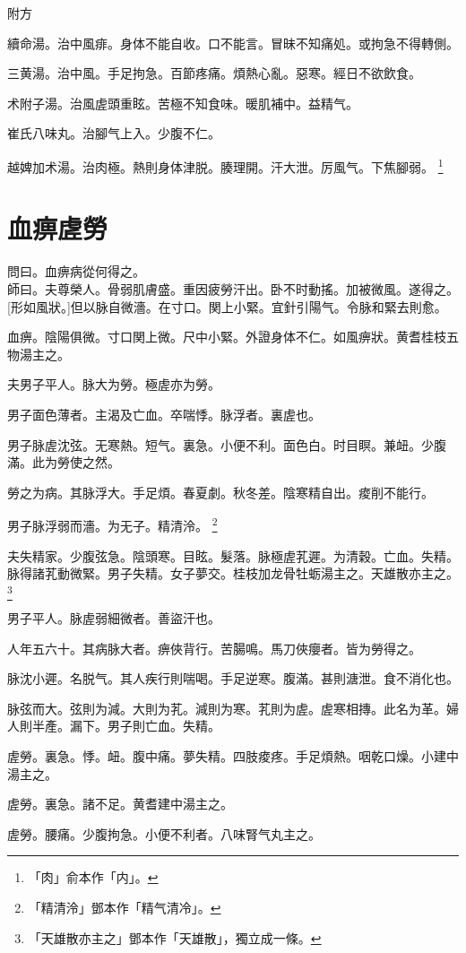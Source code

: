 \documentclass[12pt,twoside,UTF8,b5paper]{ctexbook}
\begin{document}
附方

續命湯。治中風痱。身体不能自收。口不能言。冒昧不知痛処。或拘急不得轉側。

三黄湯。治中風。手足拘急。百節疼痛。煩熱心亂。惡寒。經日不欲飲食。

术附子湯。治風虗頭重眩。苦極不知食味。暖肌補中。益精气。

崔氏八味丸。治腳气上入。少腹不仁。

越婢加术湯。治肉極。熱則身体津脱。腠理開。汗大泄。厉風气。下焦腳弱。
	\footnote{「肉」俞本作「内」。}

\chapter{血痹虗勞}

問曰。血痹病從何得之。\\
師曰。夫尊榮人。骨弱肌膚盛。重因疲勞汗出。卧不时動搖。加被微風。遂得之。[形如風狀。]但以脉自微濇。在寸口。関上小緊。宜針引陽气。令脉和緊去則愈。

血痹。陰陽俱微。寸口関上微。尺中小緊。外證身体不仁。如風痹狀。黄耆桂枝五物湯主之。

夫男子平人。脉大为勞。極虗亦为勞。

男子面色薄者。主渴及亡血。卒喘悸。脉浮者。裏虗也。

男子脉虗沈弦。无寒熱。短气。裏急。小便不利。面色白。时目瞑。兼衄。少腹滿。此为勞使之然。

勞之为病。其脉浮大。手足煩。春夏劇。秋冬差。陰寒精自出。痠削不能行。

男子脉浮弱而濇。为无子。精清泠。
	\footnote{「精清泠」鄧本作「精气清冷」。}

夫失精家。少腹弦急。陰頭寒。目眩。髮落。脉極虗芤遲。为清穀。亡血。失精。脉得諸芤動微緊。男子失精。女子夢交。桂枝加龙骨牡蛎湯主之。天雄散亦主之。
	\footnote{「天雄散亦主之」鄧本作「天雄散」，獨立成一條。}

男子平人。脉虗弱細微者。善盜汗也。

人年五六十。其病脉大者。痹俠背行。苦腸鳴。馬刀俠癭者。皆为勞得之。

脉沈小遲。名脱气。其人疾行則喘喝。手足逆寒。腹滿。甚則溏泄。食不消化也。

脉弦而大。弦則为減。大則为芤。減則为寒。芤則为虗。虗寒相摶。此名为革。婦人則半產。漏下。男子則亡血。失精。

虗勞。裏急。悸。衄。腹中痛。夢失精。四肢痠疼。手足煩熱。咽乾口燥。小建中湯主之。

虗勞。裏急。諸不足。黄耆建中湯主之。

虗勞。腰痛。少腹拘急。小便不利者。八味腎气丸主之。
\end{document}
